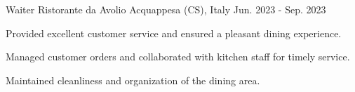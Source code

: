 
\begin{cventries}

  \cventry
    {Waiter} %
    {Ristorante da Avolio} %
    {Acquappesa (CS), Italy} %
    {Jun. 2023 - Sep. 2023} %
    {
      \begin{cvitems} %
        \item {Provided excellent customer service and ensured a pleasant dining experience.}
        \item {Managed customer orders and collaborated with kitchen staff for timely service.}
        \item {Maintained cleanliness and organization of the dining area.}
      \end{cvitems}
    }

\end{cventries}
